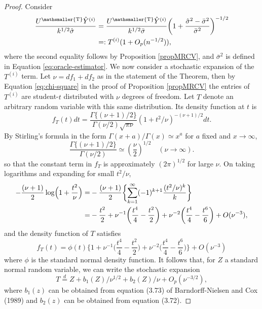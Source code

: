 \documentclass[10pt, reqno]{amsart}
\numberwithin{equation}{section}
\newcommand{\T}{{\mathsmaller {\rm T}}}
\begin{document}
\begin{appendix}
\begin{proof}
	Consider
	\begin{align*}
		\frac{U^\T \hat{Y}^{(i)}}{k^{1/2}\hat\sigma} &= \frac{U^\T \hat{Y}^{(i)}}{k^{1/2}\bar{\sigma}} \bigg(1 + \frac{\hat\sigma^2 - \bar\sigma^2}{\bar\sigma^2} \bigg)^{-1/2} \\
		&=: T^{(i)}(1 + O_p(n^{-1/2})),
	\end{align*}
	where the second equality follows by Proposition \ref{propMRCV}, and $\bar\sigma^2$ is defined in Equation \ref{eq:oracle-estimator}.
	We now consider a stochastic expansion of the $T^{(i)}$ term.
	Let $\nu=df_1+df_2$ as in the statement of the Theorem, then by  Equation \ref{eq:chi-square} in the proof of Proposition \ref{propMRCV} the entries of $T^{(i)}$ are student-$t$ distributed with $\nu$ degrees of freedom. Let $T$ denote an arbitrary random variable with this same distribution. Its density function at $t$ is
	\[
	f_{T}(t)dt = \frac{\Gamma\{(\nu+1)/2\}}{\Gamma(\nu/2)\sqrt{\pi \nu}}(1+t^2/\nu)^{-(\nu+1)/2}dt.
	\]
	By Stirling's formula in the form $\Gamma(x+a)/\Gamma(x)\simeq x^a$ for $a$ fixed and $x\rightarrow \infty$,
	\[
	\frac{\Gamma\{(\nu+1)/2\}}{\Gamma(\nu/2)} \simeq \left(\frac{\nu}{2}\right)^{1/2} \quad (\nu\rightarrow \infty).
	\]
	so that the constant term in $f_{T}$ is approximately $(2\pi)^{1/2}$ for large $\nu$. On taking logarithms and expanding for small $t^2/\nu$,
	\begin{align*}
		-\frac{(\nu+1)}{2}\log\Bigl(1+\frac{t^2}{\nu}\Bigr) =& -\frac{(\nu+1)}{2}\biggl\{\sum_{k=1}^{\infty}(-1)^{k+1}\frac{(t^{2}/\nu)^{k}}{k}\biggr\} \\
		=& -\frac{t^2}{2} + \nu^{-1}\biggl(\frac{t^4}{4} -\frac{t^2}{2}\biggr) + \nu^{-2}\biggl(\frac{t^4}{4} - \frac{t^6}{6}\biggr) + O(\nu^{-3}),
	\end{align*}
	and the density function of $T$ satisfies
	\[
	f_{T}(t) = \phi(t)\biggl\{1+ \nu^{-1}\biggl(\frac{t^4}{4} -\frac{t^2}{2}\biggr) + \nu^{-2}\biggl(\frac{t^4}{4} - \frac{t^6}{6}\biggr)\biggr\} + O(\nu^{-3})
	\]
	where $\phi$ is the standard normal density function. It follows that, for $Z$ a standard normal random variable, we can write the stochastic expansion 
	\begin{equation}\label{eqStochExpansion}
		T\stackrel{d}{=} Z + b_1(Z)/\nu^{1/2} + b_2(Z)/\nu + O_p(\nu^{-3/2}),
	\end{equation}
	where $b_1(z)$ can be obtained from equation (3.73) of Barndorff-Nielsen and Cox (1989) and $b_2(z)$ can be obtained from equation (3.72). 
	

\end{proof}
\end{appendix}
\end{document}

